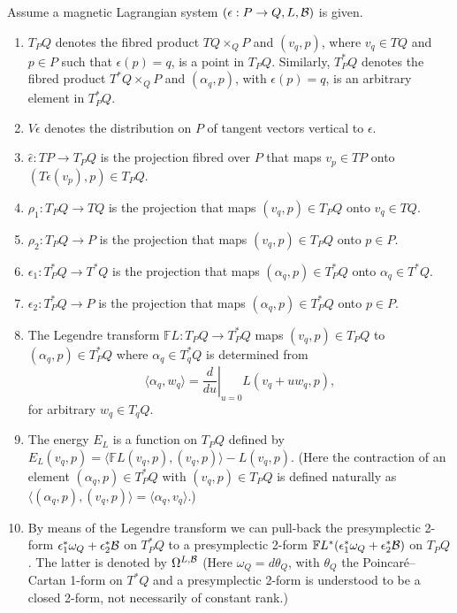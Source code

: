 \documentclass[11pt]{article}
\newcommand{\B}{{\cal B}}
\newcommand{\e}{\epsilon}
\newcommand{\F}{\mathbb{F}}
\begin{document}
\begin{definition}
Assume a magnetic Lagrangian system $(\e:P\to Q, L,\B)$ is given.
\begin{enumerate}\itemsep=0pt
\item   $T_PQ$ denotes the f\/ibred product $TQ\times_Q P$ and $(v_q,p)$, where $v_q\in TQ$ and $p\in P$ such that $\e(p)=q$, is a point in $T_PQ$. Similarly, $T_P^*Q$ denotes the f\/ibred product $T^*Q\times_Q P$ and $(\alpha_q,p)$, with $\e(p)=q$, is an arbitrary element in $T^*_PQ$.
\item $V\e$ denotes the distribution on $P$ of tangent vectors vertical to $\e$.
\item $\hat \e : TP \to T_PQ$ is the projection f\/ibred over $P$ that maps $v_p\in TP$ onto $(T\e(v_p),p)\in T_PQ$.
\item $\rho_1:T_PQ \to TQ$ is the projection that maps $(v_q,p )\in T_PQ$ onto $v_q\in TQ$.
\item $\rho_2: T_PQ \to P$ is the projection that maps $(v_q,p)\in T_PQ$ onto $p\in P$.
\item $\e_1:T_P^*Q \to T^*Q$ is the projection that maps $(\alpha_q,p )\in T_P^*Q$ onto $\alpha_q\in T^*Q$.
\item $\e_2: T_P^*Q \to P$ is the projection that maps $(\alpha_q,p)\in T_P^*Q$ onto $p\in P$.
\item The Legendre transform $\F L:T_PQ \to T_P^*Q$ maps $(v_q,p)\in T_PQ$ to $(\alpha_q,p)\in T^*_PQ$ where $\alpha_q\in T^*_qQ$ is determined from \[\langle \alpha_q, w_q\rangle = \left.\frac{d}{du}\right|_{u=0} L(v_q+uw_q,p),\] for arbitrary $w_q\in T_qQ$.
\item The energy $E_L$ is a function on $T_PQ$ def\/ined by $E_L(v_q,p) =\langle \F L (v_q,p), (v_q,p)\rangle - L(v_q,p)$. (Here the contraction of an element $(\alpha_q,p)\in T^*_PQ$ with $(v_q,p)\in T_PQ$ is def\/ined naturally as $\langle (\alpha_q,p),(v_q,p) \rangle =\langle \alpha_q,v_q\rangle$.)
\item By means of the Legendre transform we can pull-back the presymplectic 2-form $\e^*_1\omega_{Q}+\e^*_2\B$ on $T^*_PQ$ to a presymplectic 2-form $\F L^*(\e^*_1\omega_{Q} +\e^*_2\B)$ on $T_PQ$. The latter is denoted by $\Omega^{L,\B}$ (Here $\omega_{Q}=d\theta_{Q}$, with $\theta_{Q}$ the Poincar\'e--Cartan 1-form on $T^*Q$ and a presymplectic 2-form is understood to be a closed 2-form, not necessarily of constant rank.)
\end{enumerate}
\end{definition}
\end{document}
